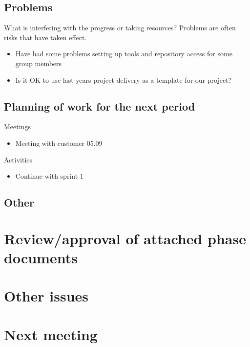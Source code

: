 \documentclass[a4paper,12pt]{article}
\begin{document}
\subsection{Problems}
What is interfering with the progress or taking resources? Problems are often risks that have taken effect.
\begin{itemize}
\item
Have had some problems setting up tools and repository access for some group members
\item
Is it OK to use last years project delivery as a template for our project?
\end{itemize}
\subsection{Planning of work for the next period}
Meetings
\begin{itemize}
\item
Meeting with customer 05.09
\end{itemize}
Activities
\begin{itemize}
\item
Continue with sprint 1
\end{itemize}
\subsection{Other}
\section{Review/approval of attached phase documents}
\section{Other issues}
\section{Next meeting}
\end{document}
